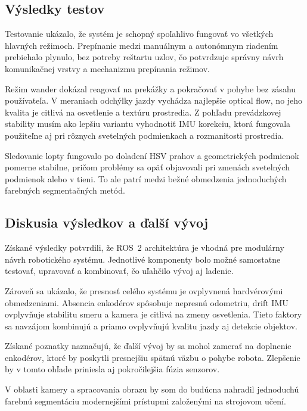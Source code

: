         \subsection{Výsledky testov}
      
        Testovanie ukázalo, že systém je schopný spoľahlivo fungovať vo všetkých hlavných režimoch. Prepínanie medzi manuálnym a autonómnym riadením prebiehalo plynulo, bez potreby reštartu uzlov, čo potvrdzuje správny návrh komunikačnej vrstvy a mechanizmu prepínania režimov.
      
        Režim wander dokázal reagovať na prekážky a pokračovať v pohybe bez zásahu používateľa. V meraniach odchýlky jazdy vychádza najlepšie optical flow, no jeho kvalita je citlivá na osvetlenie a textúru prostredia. Z pohľadu prevádzkovej stability musím ako lepšiu variantu vyhodnotiť IMU korekciu, ktorá fungovala použiteľne aj pri rôznych svetelných podmienkach a rozmanitosti prostredia.
      
        Sledovanie lopty fungovalo po doladení HSV prahov a geometrických podmienok pomerne stabilne, pričom problémy sa opäť objavovali pri zmenách svetelných podmienok alebo v tieni. To ale patrí medzi bežné obmedzenia jednoduchých farebných segmentačných metód.
      
        \subsection{Diskusia výsledkov a ďalší vývoj}
      
        Získané výsledky potvrdili, že ROS~2 architektúra je vhodná pre modulárny návrh robotického systému. Jednotlivé komponenty bolo možné samostatne testovať, upravovať a kombinovať, čo uľahčilo vývoj aj ladenie.
      
        Zároveň sa ukázalo, že presnosť celého systému je ovplyvnená hardvérovými obmedzeniami. Absencia enkodérov spôsobuje nepresnú odometriu, drift IMU ovplyvňuje stabilitu smeru a kamera je citlivá na zmeny osvetlenia. Tieto faktory sa navzájom kombinujú a priamo ovplyvňujú kvalitu jazdy aj detekcie objektov.
      
        Získané poznatky naznačujú, že ďalší vývoj by sa mohol zamerať na doplnenie enkodérov, ktoré by poskytli presnejšiu spätnú väzbu o pohybe robota.  Zlepšenie by v tomto ohľade priniesla aj pokročilejšia fúzia senzorov.

  V oblasti kamery a spracovania obrazu by som do budúcna nahradil jednoduchú farebnú segmentáciu modernejšími prístupmi založenými na strojovom učení.
      
